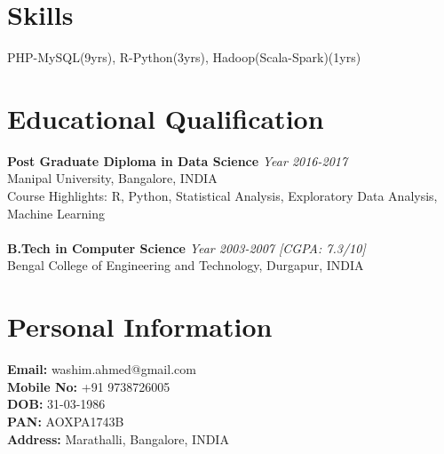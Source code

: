 \documentclass{article}
\begin{document}
\section{Skills}
PHP-MySQL(9yrs), R-Python(3yrs), Hadoop(Scala-Spark)(1yrs)

\section{Educational Qualification}
\textbf{Post Graduate Diploma in Data Science} \hfill \textit{Year 2016-2017}\\
Manipal University, \textnormal{Bangalore, INDIA}\\
Course Highlights: R, Python, Statistical Analysis, Exploratory Data Analysis, Machine Learning\\~\\
\textbf{B.Tech in Computer Science} \hfill \textit{Year 2003-2007 [CGPA: 7.3/10]}\\
Bengal College of Engineering and Technology, \textnormal{Durgapur, INDIA}

\thispagestyle{empty}
\section{Personal Information}
\textbf{Email:} washim.ahmed@gmail.com\\
\textbf{Mobile No:} +91 9738726005\\
\textbf{DOB:} 31-03-1986\\
\textbf{PAN:} AOXPA1743B\\
\textbf{Address:} Marathalli, Bangalore, INDIA\\
\end{document}
